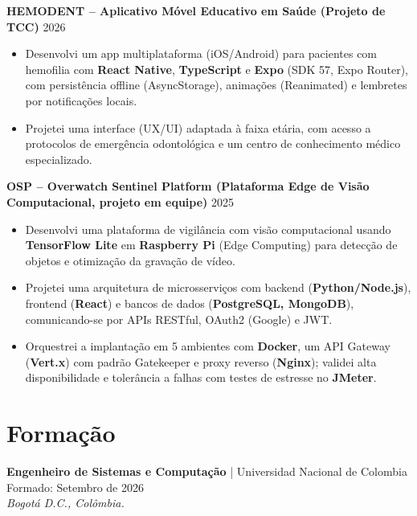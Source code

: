 \documentclass[11pt,a4paper]{article}
\begin{document}
\vspace{0.2cm}

\noindent
\textbf{HEMODENT – Aplicativo Móvel Educativo em Saúde (Projeto de TCC)} \hfill 2026
\begin{itemize}[leftmargin=*, noitemsep, topsep=2pt]
    \item Desenvolvi um app multiplataforma (iOS/Android) para pacientes com hemofilia com \textbf{React Native}, \textbf{TypeScript} e \textbf{Expo} (SDK 57, Expo Router), com persistência offline (AsyncStorage), animações (Reanimated) e lembretes por notificações locais.
    \item Projetei uma interface (UX/UI) adaptada à faixa etária, com acesso a protocolos de emergência odontológica e um centro de conhecimento médico especializado.
\end{itemize}

\vspace{0.2cm}

\noindent
\textbf{OSP – Overwatch Sentinel Platform (Plataforma Edge de Visão Computacional, projeto em equipe)} \hfill 2025
\begin{itemize}[leftmargin=*, noitemsep, topsep=2pt]
    \item Desenvolvi uma plataforma de vigilância com visão computacional usando \textbf{TensorFlow Lite} em \textbf{Raspberry Pi} (Edge Computing) para detecção de objetos e otimização da gravação de vídeo.
    \item Projetei uma arquitetura de microsserviços com backend (\textbf{Python/Node.js}), frontend (\textbf{React}) e bancos de dados (\textbf{PostgreSQL, MongoDB}), comunicando-se por APIs RESTful, OAuth2 (Google) e JWT.
    \item Orquestrei a implantação em 5 ambientes com \textbf{Docker}, um API Gateway (\textbf{Vert.x}) com padrão Gatekeeper e proxy reverso (\textbf{Nginx}); validei alta disponibilidade e tolerância a falhas com testes de estresse no \textbf{JMeter}.
\end{itemize}

\section*{Formação}

\noindent
\textbf{Engenheiro de Sistemas e Computação} | Universidad Nacional de Colombia \hfill Formado: Setembro de 2026 \\
\textit{Bogotá D.C., Colômbia.}

\vspace{0.2cm}
\end{document}

